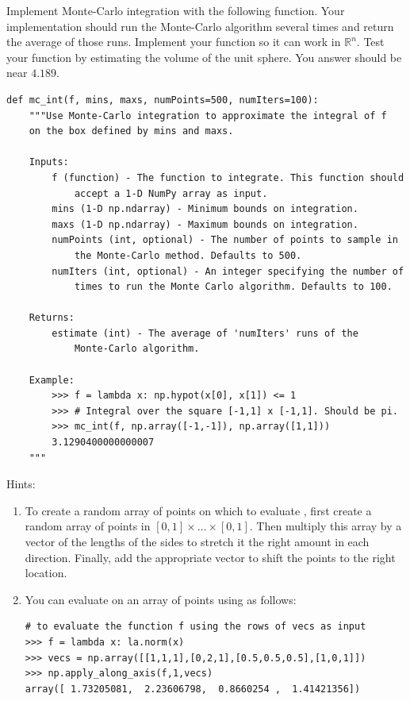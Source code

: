 \begin{problem}
\label{prob:mc}
Implement Monte-Carlo integration with the following function.
Your implementation should run the Monte-Carlo algorithm several times 
and return the average of those runs. Implement your function so it can work 
in $\mathbb{R}^n$. Test your function by estimating the volume of the unit sphere. 
You answer should be near $4.189$.
\begin{lstlisting}
def mc_int(f, mins, maxs, numPoints=500, numIters=100):
    """Use Monte-Carlo integration to approximate the integral of f
    on the box defined by mins and maxs.
    
    Inputs:
        f (function) - The function to integrate. This function should 
            accept a 1-D NumPy array as input.
        mins (1-D np.ndarray) - Minimum bounds on integration.
        maxs (1-D np.ndarray) - Maximum bounds on integration.
        numPoints (int, optional) - The number of points to sample in 
            the Monte-Carlo method. Defaults to 500.
        numIters (int, optional) - An integer specifying the number of 
            times to run the Monte Carlo algorithm. Defaults to 100.
        
    Returns:
        estimate (int) - The average of 'numIters' runs of the 
            Monte-Carlo algorithm.
                
    Example:
        >>> f = lambda x: np.hypot(x[0], x[1]) <= 1
        >>> # Integral over the square [-1,1] x [-1,1]. Should be pi.
        >>> mc_int(f, np.array([-1,-1]), np.array([1,1]))
        3.1290400000000007
    """
\end{lstlisting}

Hints:
\begin{enumerate}
\item To create a random array of points on which to evaluate , first create a random array of points in $[0,1] \times \ldots \times [0,1]$.
Then multiply this array by a vector of the lengths of the sides to stretch it the right amount in each direction.
Finally, add the appropriate vector to shift the points to the right location.
\item You can evaluate  on an array of points using  as follows:
\begin{lstlisting}
# to evaluate the function f using the rows of vecs as input
>>> f = lambda x: la.norm(x)
>>> vecs = np.array([[1,1,1],[0,2,1],[0.5,0.5,0.5],[1,0,1]])
>>> np.apply_along_axis(f,1,vecs)
array([ 1.73205081,  2.23606798,  0.8660254 ,  1.41421356])
\end{lstlisting}

\end{enumerate}
\end{problem}

